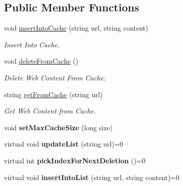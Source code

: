 \subsection*{\-Public \-Member \-Functions}
\begin{DoxyCompactItemize}
\item 
void \hyperlink{classAbstractCache_adcfda4aa5503e9ea60d2bc5575c04cd3}{insert\-Into\-Cache} (string url, string content)
\begin{DoxyCompactList}\small\item\em \-Insert \-Into \-Cache. \end{DoxyCompactList}\item 
void \hyperlink{classAbstractCache_a7cba328082bcd2f8a02e52546b9dd244}{delete\-From\-Cache} ()
\begin{DoxyCompactList}\small\item\em \-Delete \-Web \-Content \-From \-Cache. \end{DoxyCompactList}\item 
string \hyperlink{classAbstractCache_a9b49b5835bbe2fa878bac959ebbec925}{get\-From\-Cache} (string url)
\begin{DoxyCompactList}\small\item\em \-Get \-Web \-Content from \-Cache. \end{DoxyCompactList}\item 
\hypertarget{classAbstractCache_a0b8d729d097b1726cb01fa8d35a25e62}{void {\bfseries set\-Max\-Cache\-Size} (long size)}\label{classAbstractCache_a0b8d729d097b1726cb01fa8d35a25e62}

\item 
\hypertarget{classAbstractCache_a67552fbca85ce7dbc7e2c553b1036884}{virtual void {\bfseries update\-List} (string url)=0}\label{classAbstractCache_a67552fbca85ce7dbc7e2c553b1036884}

\item 
\hypertarget{classAbstractCache_ae9fe168b0b9167c27b94b4a3a1be788c}{virtual int {\bfseries pick\-Index\-For\-Next\-Deletion} ()=0}\label{classAbstractCache_ae9fe168b0b9167c27b94b4a3a1be788c}

\item 
\hypertarget{classAbstractCache_a910756174d1ee21eac16a4be3f7c881a}{virtual void {\bfseries insert\-Into\-List} (string url, string content)=0}\label{classAbstractCache_a910756174d1ee21eac16a4be3f7c881a}

\end{DoxyCompactItemize}
